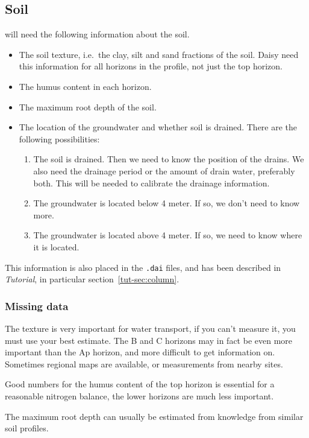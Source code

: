 \documentclass[a4paper,11pt,twoside]{article}
\newcommand{\daisytut}{\textit{\Daisy{} Tutorial}}
\begin{document}
\subsection{Soil}

\Daisy{} will need the following information about the soil.
\begin{itemize}
\item The soil texture, i.e.\ the clay, silt and sand fractions of the
  soil.  Daisy need this information for all horizons in the profile,
  not just the top horizon.
\item The humus content in each horizon.
\item The maximum root depth of the soil.
\item The location of the groundwater and whether soil is drained.
  There are the following possibilities:
  \begin{enumerate}
  \item The soil is drained.  Then we need to know the position of the
    drains.  We also need the drainage period or the amount of drain
    water, preferably both.  This will be needed to calibrate the
    drainage information.
  \item The groundwater is located below 4 meter.  If so, we don't
    need to know more.
  \item The groundwater is located above 4 meter.  If so, we need to
    know where it is located.
  \end{enumerate}
\end{itemize}
This information is also placed in the \texttt{.dai} files, and has
been described in \daisytut{}, in particular
section~\ref{tut-sec:column}. 

\subsubsection{Missing data}

The texture is very important for water transport, if you can't measure
it, you must use your best estimate.  The B and C horizons may in fact
be even more important than the Ap horizon, and more difficult to get
information on.  Sometimes regional maps are available, or
measurements from nearby sites.

Good numbers for the humus content of the top horizon is essential for
a reasonable nitrogen balance, the lower horizons are much less
important.

The maximum root depth can usually be estimated from knowledge from
similar soil profiles.
\end{document}
